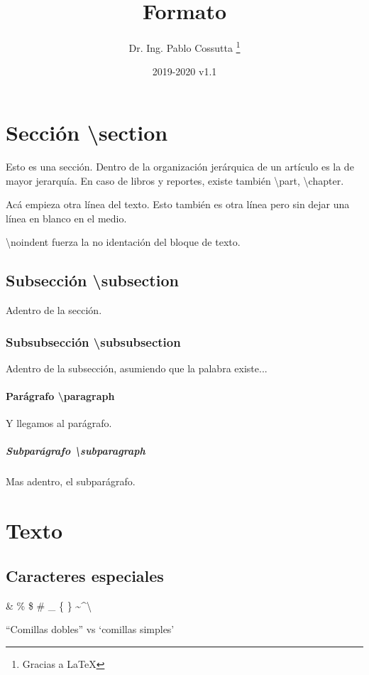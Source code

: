 \documentclass[11pt, a4paper]{article}
\title{Formato}
\author{Dr. Ing. Pablo Cossutta \thanks{Gracias a \LaTeX}}
\date{2019-2020 v1.1}
\begin{document}
\maketitle
\section{Sección \textbackslash section} \label{sec1}
Esto es una sección. Dentro de la organización jerárquica de un artículo es la de mayor jerarquía. En caso de libros y reportes, existe también \textbackslash part, \textbackslash chapter.

Acá empieza otra línea del texto.
Esto también es otra línea pero sin dejar una línea en blanco en el medio. 

\noindent \textbackslash noindent fuerza la no identación del bloque de texto.

\subsection{Subsección \textbackslash subsection}
Adentro de la sección. 

\subsubsection{Subsubsección \textbackslash subsubsection}
Adentro de la subsección, asumiendo que la palabra existe...

\paragraph{Parágrafo \textbackslash paragraph}
Y llegamos al parágrafo.
\subparagraph{Subparágrafo \textbackslash subparagraph}
Mas adentro, el subparágrafo.

\section{Texto}
\subsection{Caracteres especiales}
\& \% \$ \# \_ \{ \} \textasciitilde \textasciicircum \textbackslash

``Comillas dobles'' vs `comillas simples'
\end{document}

